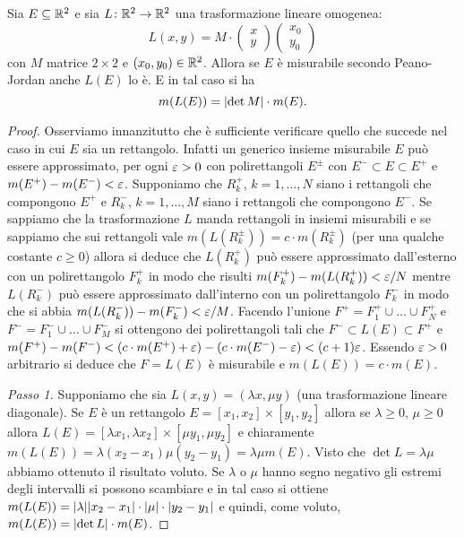\begin{theorem}
Sia $E\subseteq \mathbb R^2$ e sia $L\colon \mathbb R^2\to\mathbb R^2$ una trasformazione
lineare omogenea:
\[
  L(x,y) = M\cdot \begin{pmatrix}x \\ y\end{pmatrix}\begin{pmatrix}x_0 \\ y_0\end{pmatrix}
\]
con $M$ matrice $2\times 2$ e $(x_0 ,y_0)\in \mathbb R^2$.
Allora se $E$ è misurabile secondo Peano-Jordan anche $L(E)$ lo è.
E in tal caso si ha
\begin{equation}\label{eq:formula_area}
  m(L(E)) = {\left|\det M\right|} \cdot m(E).
\end{equation}
\end{theorem}
%
\begin{proof}

Osserviamo innanzitutto che è sufficiente verificare
quello che succede nel caso in cui $E$ sia un rettangolo.
Infatti un generico insieme misurabile $E$ può essere approssimato,
per ogni $\varepsilon>0$ con polirettangoli $E^\pm$ con $E^-\subset E \subset E^+$ e $m(E^+) - m(E^-) < \varepsilon$.
Supponiamo che $R^+_k$, $k=1,\dots, N$ siano i rettangoli che compongono $E^+$ e $R^-_k$, $k=1,\dots, M$ siano i rettangoli che compongono $E^-$.
Se sappiamo che la trasformazione $L$ manda rettangoli in insiemi
misurabili e se sappiamo che sui rettangoli vale $m(L(R_k^\pm)) = c \cdot m(R_k^\pm)$
(per una qualche costante $c\ge 0$) allora si deduce che $L(R_k^+)$ può essere approssimato dall'esterno con un polirettangolo
$F_k^+$ in modo che risulti $m(F_k^+) - m(L(R_k^+)) < \varepsilon/N$ mentre $L(R_k^-)$ può essere approssimato dall'interno con un polirettangolo $F_k^-$ in modo che si abbia $m(L(R_k^-))-m(F_k^-) < \varepsilon/M$. Facendo l'unione $F^+ = F_1^+ \cup \dots \cup F_N^+$
e $F^- = F_1^- \cup \dots \cup F_M^-$ si ottengono dei polirettangoli tali che $F^- \subset L(E)\subset F^+$ e
$m(F^+) - m(F^-) < (c\cdot  m(E^+) + \varepsilon) - (c \cdot m(E^-) -\varepsilon)
< (c+1) \varepsilon$. Essendo $\varepsilon>0$ arbitrario si deduce
che $F=L(E)$ è misurabile e $m(L(E)) = c\cdot  m(E)$.


\emph{Passo 1.}
Supponiamo che sia
$L(x,y) = (\lambda x,\mu y)$  (una trasformazione lineare diagonale).
Se $E$ è un rettangolo $E=[x_1,x_2]\times[y_1,y_2]$
allora se $\lambda\ge 0$, $\mu\ge 0$ allora $L(E) = [\lambda x_1, \lambda x_2] \times [\mu y_1, \mu y_2]$
e chiaramente $m(L(E)) = \lambda (x_2-x_1) \mu (y_2-y_1) = \lambda \mu m(E)$. Visto che $\det L = \lambda \mu$ abbiamo ottenuto il risultato voluto.
Se $\lambda$ o $\mu$ hanno segno negativo
gli estremi degli intervalli si possono
scambiare e in tal caso si ottiene $m(L(E)) = {\left|\lambda\right|}{\left|x_2-x_1\right|} \cdot {\left|\mu\right|} \cdot {\left|y_2-y_1\right|}$ e quindi, come
voluto, $m(L(E))={\left|\det L\right|} \cdot m(E)$.


\end{proof}
